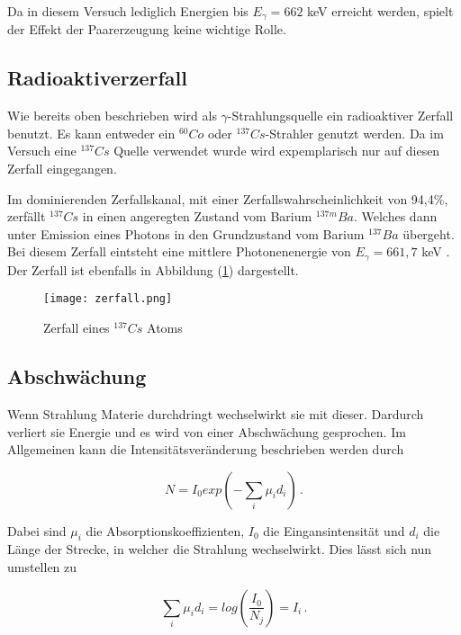 \noindent
Da in diesem Versuch lediglich Energien bis $E_{\gamma} = 662$ keV erreicht werden, spielt der Effekt der Paarerzeugung keine wichtige Rolle. 


\subsection{Radioaktiverzerfall}
Wie bereits oben beschrieben wird als $\gamma$-Strahlungsquelle ein radioaktiver Zerfall benutzt. Es kann entweder ein $^{60} Co$ oder $^{137} Cs$-Strahler genutzt werden.
Da im Versuch eine $^{137} Cs$ Quelle verwendet wurde wird expemplarisch nur auf diesen Zerfall eingegangen.

\noindent
Im dominierenden Zerfallskanal, mit einer Zerfallswahrscheinlichkeit von 94,4\%, zerfällt $^{137} Cs$ in einen angeregten Zustand vom Barium $^{137m} Ba$. Welches dann
unter Emission eines Photons in den Grundzustand vom Barium $^{137} Ba$ übergeht. Bei diesem Zerfall eintsteht eine mittlere Photonenenergie von $E_{\gamma} = 661,7$ keV \cite{Zerfall}.
Der Zerfall ist ebenfalls in Abbildung (\ref{fig:zer}) dargestellt.


\begin{figure}
  \centering
  \texttt{[image: zerfall.png]}
  \caption{Zerfall eines $^{137} Cs$ Atoms \cite{Zerfall}}
  \label{fig:zer}
\end{figure}


\subsection{Abschwächung}
Wenn Strahlung Materie durchdringt wechselwirkt sie mit dieser. Dardurch verliert sie Energie und es wird von einer Abschwächung gesprochen.
Im Allgemeinen kann die Intensitätsveränderung beschrieben werden durch 

\begin{equation}
  N = I_0 exp \left(- \sum_i \mu_i d_i \right) \, .
  \label{eqn:exp}
\end{equation}

Dabei sind $\mu_i$ die Absorptionskoeffizienten, $I_0$ die Eingansintensität und $d_i$ die Länge der Strecke, in welcher die Strahlung wechselwirkt. Dies 
lässt sich nun umstellen zu 

\begin{equation}
  \sum_i \mu_i d_i = log \left( \frac{I_0}{N_j}  \right) = I_i \, .
  \label{eqn:log}
\end{equation}

